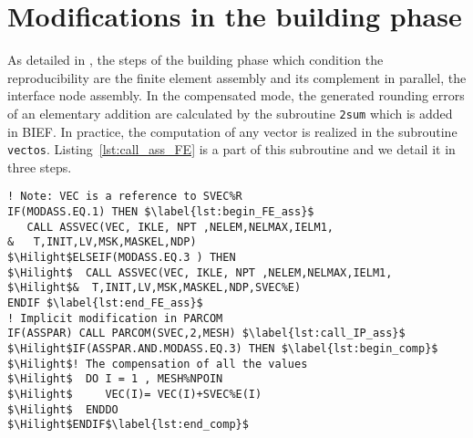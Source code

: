\section{Modifications in the building phase }
\label{sec:build_implement}
%
As detailed in \cite{LaND16}, the steps of the building
phase which condition the reproducibility
are the finite element assembly and its complement in parallel,
the interface node assembly.
In the compensated mode, the generated rounding errors of an elementary
addition are calculated by the subroutine \texttt{2sum} which is added in BIEF.
In practice, the computation of any vector
is realized in the subroutine \texttt{vectos}.
Listing~\ref{lst:call_ass_FE} is a part of this subroutine and
we detail it in three steps.
%
\begin{lstlisting}[language=TelFortran, caption={The call of the FE assembly under the two modes of the computation in \texttt{vectos}},label={lst:call_ass_FE},escapechar=\$]
! Note: VEC is a reference to SVEC%R
IF(MODASS.EQ.1) THEN $\label{lst:begin_FE_ass}$
   CALL ASSVEC(VEC, IKLE, NPT ,NELEM,NELMAX,IELM1,
&   T,INIT,LV,MSK,MASKEL,NDP)
$\Hilight$ELSEIF(MODASS.EQ.3 ) THEN
$\Hilight$  CALL ASSVEC(VEC, IKLE, NPT ,NELEM,NELMAX,IELM1,
$\Hilight$&  T,INIT,LV,MSK,MASKEL,NDP,SVEC%E)
ENDIF $\label{lst:end_FE_ass}$
! Implicit modification in PARCOM
IF(ASSPAR) CALL PARCOM(SVEC,2,MESH) $\label{lst:call_IP_ass}$
$\Hilight$IF(ASSPAR.AND.MODASS.EQ.3) THEN $\label{lst:begin_comp}$
$\Hilight$! The compensation of all the values
$\Hilight$  DO I = 1 , MESH%NPOIN
$\Hilight$     VEC(I)= VEC(I)+SVEC%E(I)
$\Hilight$  ENDDO
$\Hilight$ENDIF$\label{lst:end_comp}$
\end{lstlisting}
%
